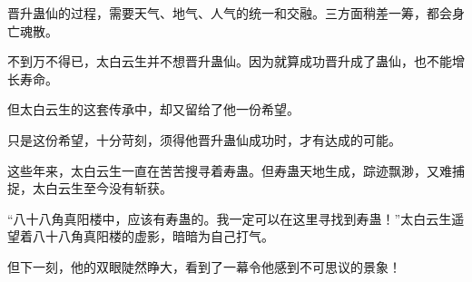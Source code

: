\begin{this_body}
晋升蛊仙的过程，需要天气、地气、人气的统一和交融。三方面稍差一筹，都会身亡魂散。

不到万不得已，太白云生并不想晋升蛊仙。因为就算成功晋升成了蛊仙，也不能增长寿命。

但太白云生的这套传承中，却又留给了他一份希望。

只是这份希望，十分苛刻，须得他晋升蛊仙成功时，才有达成的可能。

这些年来，太白云生一直在苦苦搜寻着寿蛊。但寿蛊天地生成，踪迹飘渺，又难捕捉，太白云生至今没有斩获。

“八十八角真阳楼中，应该有寿蛊的。我一定可以在这里寻找到寿蛊！”太白云生遥望着八十八角真阳楼的虚影，暗暗为自己打气。

但下一刻，他的双眼陡然睁大，看到了一幕令他感到不可思议的景象！

\end{this_body}

